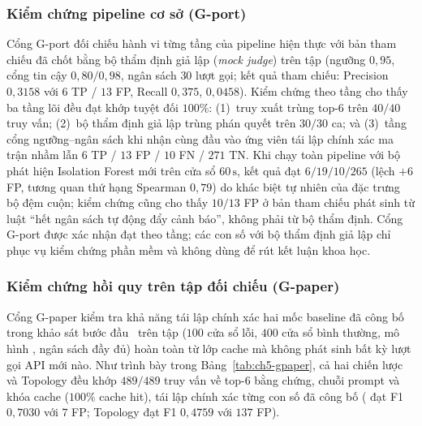 \subsubsection{Kiểm chứng pipeline cơ sở (G-port)}
\label{sec:ch5-gport}

Cổng G-port đối chiếu hành vi từng tầng của pipeline hiện thực với bản tham chiếu đã chốt bằng bộ thẩm định giả lập (\emph{mock judge}) trên tập  (ngưỡng $0{,}95$, cổng tin cậy $0{,}80 / 0{,}98$, ngân sách $30$ lượt gọi; kết quả tham chiếu: Precision $0{,}3158$ với $6$ TP / $13$ FP, Recall $0{,}375$,  $0{,}0458$). Kiểm chứng theo tầng cho thấy ba tầng lõi đều đạt khớp tuyệt đối $100\%$: (1)~truy xuất  trùng top-6 trên $40/40$ truy vấn; (2)~bộ thẩm định giả lập trùng phán quyết trên $30/30$ ca; và (3)~tầng cổng ngưỡng--ngân sách khi nhận cùng đầu vào ứng viên tái lập chính xác ma trận nhầm lẫn $6$ TP / $13$ FP / $10$ FN / $271$ TN. Khi chạy toàn pipeline với bộ phát hiện Isolation Forest mới trên cửa sổ $60\,\text{s}$, kết quả đạt $6/19/10/265$ (lệch $+6$ FP, tương quan thứ hạng Spearman $0{,}79$) do khác biệt tự nhiên của đặc trưng bộ đệm cuộn; kiểm chứng cũng cho thấy $10/13$ FP ở bản tham chiếu phát sinh từ luật ``hết ngân sách tự động đẩy cảnh báo'', không phải từ bộ thẩm định. Cổng G-port được xác nhận đạt theo tầng; các con số với bộ thẩm định giả lập chỉ phục vụ kiểm chứng phần mềm và không dùng để rút kết luận khoa học.

\subsubsection{Kiểm chứng hồi quy trên tập đối chiếu (G-paper)}
\label{sec:ch5-gpaper}

Cổng G-paper kiểm tra khả năng tái lập chính xác hai mốc baseline đã công bố trong khảo sát bước đầu~\cite{icaetm2026} trên tập  ($100$ cửa sổ lỗi, $400$ cửa sổ bình thường, mô hình , ngân sách đầy đủ) hoàn toàn từ lớp cache mà không phát sinh bất kỳ lượt gọi API mới nào. Như trình bày trong Bảng~\ref{tab:ch5-gpaper}, cả hai chiến lược  và Topology đều khớp $489/489$ truy vấn về top-6 bằng chứng, chuỗi prompt và khóa cache ($100\%$ cache hit), tái lập chính xác từng con số đã công bố ( đạt F1 $0{,}7030$ với $7$ FP; Topology đạt F1 $0{,}4759$ với $137$ FP).

